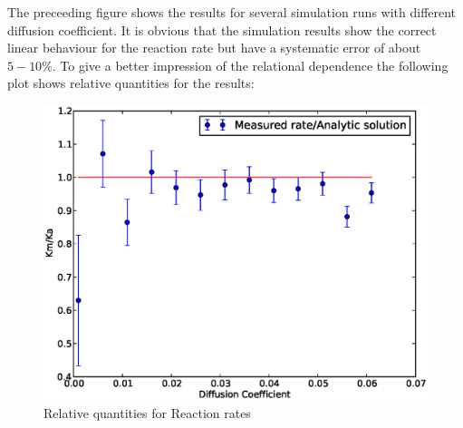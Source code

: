 The preceeding figure shows the results for several simulation runs with different diffusion coefficient. It is obvious that the simulation results show the correct linear behaviour for the reaction rate but have a systematic error of about $5 - 10 \%$. To give a better impression of the relational dependence the following plot shows relative quantities for the results:
\begin{figure}[H]
    \centering
    \includegraphics[width = .9 \textwidth, keepaspectratio]{Krel.eps}
    \caption{Relative quantities for Reaction rates}
    \label{fig:Krel_d}
\end{figure}
